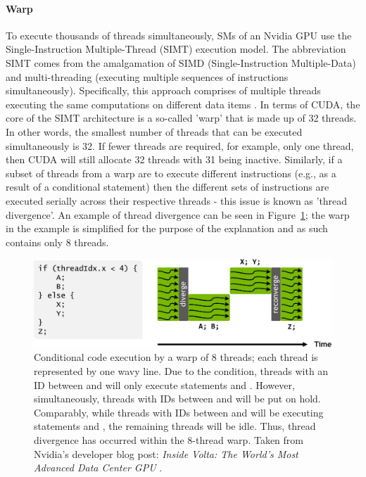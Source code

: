 \paragraph{Warp}\label{Paragraph:CUDA-thread-management-warp}
To execute thousands of threads simultaneously, SMs of an Nvidia GPU use the Single-Instruction Multiple-Thread (SIMT) execution model. The abbreviation SIMT comes from the amalgamation of SIMD (Single-Instruction Multiple-Data) and multi-threading (executing multiple sequences of instructions simultaneously). Specifically, this approach comprises of multiple threads executing the same computations on different data items \cite{Marziale2010}. In terms of CUDA, the core of the SIMT architecture is a so-called 'warp' that is made up of 32 threads. In other words, the smallest number of threads that can be executed simultaneously is 32. If fewer threads are required, for example, only one thread, then CUDA will still allocate 32 threads with 31 being inactive. Similarly, if a subset of threads from a warp are to execute different instructions (e.g., as a result of a conditional statement) then the different sets of instructions are executed serially across their respective threads - this issue is known as 'thread divergence'. An example of thread divergence can be seen in Figure~\ref{Figure:CUDA-warp-thread-divergence}; the warp in the example is simplified for the purpose of the explanation and as such contains only 8 threads.

\begin{figure}[h!]
	\centering
	\includegraphics[width=14cm, keepaspectratio]{images/ch1/CUDA_warp_divergence_execution_path.jpg}
	\caption{Conditional code execution by a warp of 8 threads; each thread is represented by one wavy line. Due to the condition, threads with an ID between  and  will only execute statements  and . However, simultaneously, threads with IDs between  and  will be put on hold. Comparably, while threads with IDs between  and  will be executing statements  and , the remaining threads will be idle. Thus, thread divergence has occurred within the 8-thread warp. Taken from Nvidia's developer blog post: \emph{Inside Volta: The World's Most Advanced Data Center GPU} \cite{Durant10May2017}.}
	\label{Figure:CUDA-warp-thread-divergence}
\end{figure}

